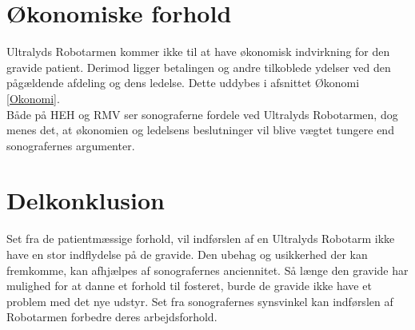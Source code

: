\section{Økonomiske forhold}
Ultralyds Robotarmen kommer ikke til at have økonomisk indvirkning for den gravide patient. Derimod ligger betalingen og andre tilkoblede ydelser ved den pågældende afdeling og dens ledelse. Dette uddybes i afsnittet Økonomi \ref{Okonomi}. \\
Både på HEH og RMV ser sonograferne fordele ved Ultralyds Robotarmen, dog menes det, at økonomien og ledelsens beslutninger vil blive vægtet tungere end sonografernes argumenter.  
 
\section{Delkonklusion }
Set fra de patientmæssige forhold, vil indførslen af en Ultralyds Robotarm ikke have en stor indflydelse på de gravide. Den ubehag og usikkerhed der kan fremkomme, kan afhjælpes af sonografernes anciennitet. Så længe den gravide har mulighed for at danne et forhold til fosteret, burde de gravide ikke have et problem med det nye udstyr. 
Set fra sonografernes synsvinkel kan indførslen af Robotarmen forbedre deres arbejdsforhold. 